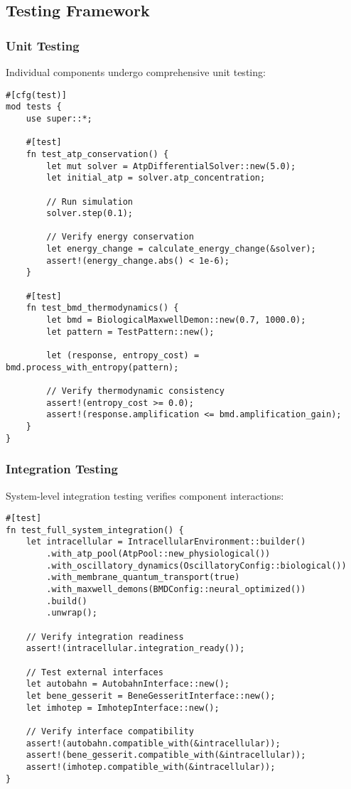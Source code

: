 \documentclass[12pt,a4paper]{article}
\begin{document}
\subsection{Testing Framework}

\subsubsection{Unit Testing}

Individual components undergo comprehensive unit testing:

\begin{lstlisting}[style=ruststyle]
#[cfg(test)]
mod tests {
    use super::*;
    
    #[test]
    fn test_atp_conservation() {
        let mut solver = AtpDifferentialSolver::new(5.0);
        let initial_atp = solver.atp_concentration;
        
        // Run simulation
        solver.step(0.1);
        
        // Verify energy conservation
        let energy_change = calculate_energy_change(&solver);
        assert!(energy_change.abs() < 1e-6);
    }
    
    #[test]
    fn test_bmd_thermodynamics() {
        let bmd = BiologicalMaxwellDemon::new(0.7, 1000.0);
        let pattern = TestPattern::new();
        
        let (response, entropy_cost) = bmd.process_with_entropy(pattern);
        
        // Verify thermodynamic consistency
        assert!(entropy_cost >= 0.0);
        assert!(response.amplification <= bmd.amplification_gain);
    }
}
\end{lstlisting}

\subsubsection{Integration Testing}

System-level integration testing verifies component interactions:

\begin{lstlisting}[style=ruststyle]
#[test]
fn test_full_system_integration() {
    let intracellular = IntracellularEnvironment::builder()
        .with_atp_pool(AtpPool::new_physiological())
        .with_oscillatory_dynamics(OscillatoryConfig::biological())
        .with_membrane_quantum_transport(true)
        .with_maxwell_demons(BMDConfig::neural_optimized())
        .build()
        .unwrap();
    
    // Verify integration readiness
    assert!(intracellular.integration_ready());
    
    // Test external interfaces
    let autobahn = AutobahnInterface::new();
    let bene_gesserit = BeneGesseritInterface::new();
    let imhotep = ImhotepInterface::new();
    
    // Verify interface compatibility
    assert!(autobahn.compatible_with(&intracellular));
    assert!(bene_gesserit.compatible_with(&intracellular));
    assert!(imhotep.compatible_with(&intracellular));
}
\end{lstlisting}
\end{document}
